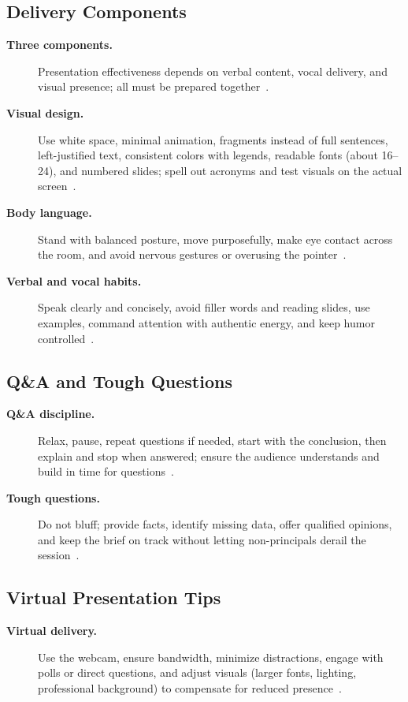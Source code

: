 \documentclass[../main.tex]{subfiles}
\begin{document}
\subsection{Delivery Components}
\begin{description}
  \item[\textbf{Three components.}] Presentation effectiveness depends on verbal content, vocal delivery, and visual presence; all must be prepared together~\autocite{edo-5-1-4-presentation-techniques-2025}.
  \item[\textbf{Visual design.}] Use white space, minimal animation, fragments instead of full sentences, left-justified text, consistent colors with legends, readable fonts (about 16--24), and numbered slides; spell out acronyms and test visuals on the actual screen~\autocite{edo-5-1-4-presentation-techniques-2025}.
  \item[\textbf{Body language.}] Stand with balanced posture, move purposefully, make eye contact across the room, and avoid nervous gestures or overusing the pointer~\autocite{edo-5-1-4-presentation-techniques-2025}.
  \item[\textbf{Verbal and vocal habits.}] Speak clearly and concisely, avoid filler words and reading slides, use examples, command attention with authentic energy, and keep humor controlled~\autocite{edo-5-1-4-presentation-techniques-2025}.
\end{description}

\subsection{Q\&A and Tough Questions}
\begin{description}
  \item[\textbf{Q\&A discipline.}] Relax, pause, repeat questions if needed, start with the conclusion, then explain and stop when answered; ensure the audience understands and build in time for questions~\autocite{edo-5-1-4-presentation-techniques-2025}.
  \item[\textbf{Tough questions.}] Do not bluff; provide facts, identify missing data, offer qualified opinions, and keep the brief on track without letting non-principals derail the session~\autocite{edo-5-1-4-presentation-techniques-2025}.
\end{description}

\subsection{Virtual Presentation Tips}
\begin{description}
  \item[\textbf{Virtual delivery.}] Use the webcam, ensure bandwidth, minimize distractions, engage with polls or direct questions, and adjust visuals (larger fonts, lighting, professional background) to compensate for reduced presence~\autocite{edo-5-1-4-presentation-techniques-2025}.
\end{description}
\end{document}

